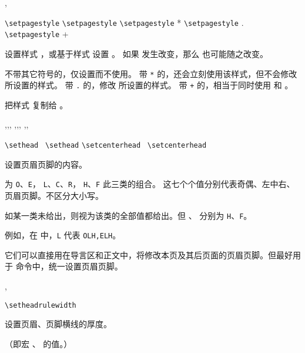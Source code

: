 \documentclass{cusdoc}
\begin{document}
\begin{function}{\setpagestyle,\copypagestyle}
  \begin{syntax}
    \verb|\setpagestyle|    
    \verb|\setpagestyle|     
    \verb|\setpagestyle| *   
    \verb|\setpagestyle| .   
    \verb|\setpagestyle| +   
    \V\copypagestyle  {} 
  \end{syntax}
设置样式 ，或基于样式  设置 。
如果  发生改变，那么  也可能随之改变。

不带其它符号的，仅设置而不使用。
带 \verb|*| 的，还会立刻使用该样式，但不会修改  所设置的样式。
带 \verb|.| 的，修改  所设置的样式。
带 \verb|+| 的，相当于同时使用  和 。

 把样式  复制给 。
\end{function}

\begin{function}{\sethead,\setfoot,\setheadfoot,
  \setlefthead,\setcenterhead,\setrighthead,
  \setleftfoot,\setcenterfoot,\setrightfoot}
  \begin{syntax}
    \verb|\sethead|         \,
    \verb|\sethead|  
    \verb|\setcenterhead|           \,
    \verb|\setcenterhead|  
  \end{syntax}
设置页眉页脚的内容。

 为 \texttt{O}、\texttt{E}， \texttt{L}、\texttt{C}、\texttt{R}，
\texttt{H}、\texttt{F} 此三类的组合。
这七个个值分别代表奇偶、左中右、页眉页脚。不区分大小写。

如某一类未给出，则视为该类的全部值都给出。但 、 分别为 \texttt{H}、\texttt{F}。

例如，在  中，\verb|L| 代表 \verb|OLH,ELH|。

它们可以直接用在导言区和正文中，将修改本页及其后页面的页眉页脚。但最好用于 
 命令中，统一设置页眉页脚。
\end{function}

\begin{function}{\setheadrulewidth,\setfootrulewidth}
  \begin{syntax}
    \verb|\setheadrulewidth| 
  \end{syntax}
设置页眉、页脚横线的厚度。

（即宏 、 的值。）
\end{function}
\end{document}
